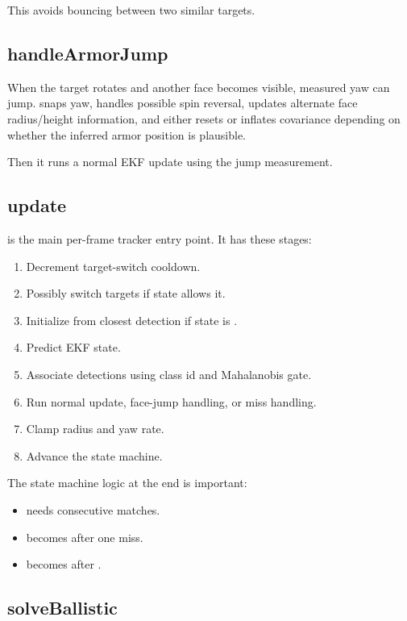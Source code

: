 This avoids bouncing between two similar targets.

\subsection{handleArmorJump}

When the target rotates and another face becomes visible, measured yaw can
jump.  snaps yaw, handles possible spin reversal, updates
alternate face radius/height information, and either resets or inflates
covariance depending on whether the inferred armor position is plausible.

Then it runs a normal EKF update using the jump measurement.

\subsection{update}

 is the main per-frame tracker entry point. It has these stages:

\begin{enumerate}
  \item Decrement target-switch cooldown.
  \item Possibly switch targets if state allows it.
  \item Initialize from closest detection if state is .
  \item Predict EKF state.
  \item Associate detections using class id and Mahalanobis gate.
  \item Run normal update, face-jump handling, or miss handling.
  \item Clamp radius and yaw rate.
  \item Advance the state machine.
\end{enumerate}

The state machine logic at the end is important:

\begin{itemize}
  \item {} needs  consecutive matches.
  \item {} becomes  after one miss.
  \item {} becomes  after .
\end{itemize}

\subsection{solveBallistic}

